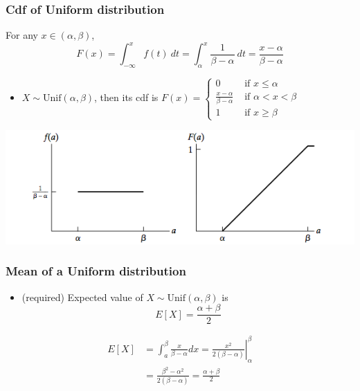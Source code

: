 \documentclass[slidestop,compress,mathserif]{beamer}
\begin{document}
\begin{frame}\frametitle{Cdf of Uniform distribution}
For any $x \in (\alpha, \beta)$,
\[
F(x) = \int_{-\infty}^x f(t)~dt
       = \int_{\alpha}^x \frac{1}{\beta-\alpha}~dt
       = \frac{x-\alpha}{\beta-\alpha}
\]

\begin{itemize}
\item $X \sim \text{Unif}(\alpha, \beta)$, then its cdf is
$
F(x) =
\begin{cases}
0 & \text{ if } x \leq \alpha\\
\frac{x-\alpha}{\beta-\alpha} & \text{ if } \alpha < x < \beta\\
1 & \text{ if } x \geq \beta
\end{cases}
$
\end{itemize}


\begin{center}
\includegraphics[scale = 0.55]{figures/uniform}
\end{center}



\end{frame}


\begin{frame}\frametitle{Mean of a Uniform distribution}
\begin{itemize}
\item ({\color{red}required}) Expected value of $X\sim \text{Unif}(\alpha, \beta)$ is
\[ E[X]   = \frac{\alpha + \beta}{2} \]
\end{itemize}


\begin{align*}
E[X]   &= \int_a^\beta \frac{x}{\beta-\alpha} dx
        = \left. \frac{x^2}{2(\beta-\alpha)} \right|_\alpha^\beta \\
       &= \frac{\beta^2-\alpha^2}{2(\beta-\alpha)} = \frac{\alpha + \beta}{2} \\ \\
\end{align*}




\end{frame}
\end{document}
